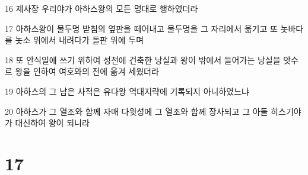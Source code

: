 \par 16 제사장 우리야가 아하스왕의 모든 명대로 행하였더라
\par 17 아하스왕이 물두멍 받침의 옆판을 떼어내고 물두멍을 그 자리에서 옮기고 또 놋바다를 놋소 위에서 내려다가 돌판 위에 두며
\par 18 또 안식일에 쓰기 위하여 성전에 건축한 낭실과 왕이 밖에서 들어가는 낭실을 앗수르 왕을 인하여 여호와의 전에 옮겨 세웠더라
\par 19 아하스의 그 남은 사적은 유다왕 역대지략에 기록되지 아니하였느냐
\par 20 아하스가 그 열조와 함께 자매 다윗성에 그 열조와 함께 장사되고 그 아들 히스기야가 대신하여 왕이 되니라

\chapter{17}

